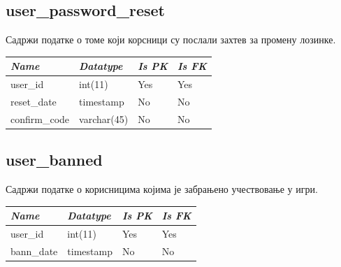 \subsection{user\_password\_reset}
Садржи податке о томе који корсници су послали захтев за промену лозинке.

\begin{table}[h!]
\centering
\small

    \begin{tabular}{ | m{} | m{} | m{} | m{} | }
    \hline
        \cellcolor{blue!25}\textbf{\textit{Name}} &

        \cellcolor{blue!25}\textbf{\textit{Datatype}} &
        \cellcolor{blue!25}\textbf{\textit{Is PK}} &
        \cellcolor{blue!25}\textbf{\textit{Is FK}} \\
    \hline
    \hline
        user\_id & int(11) & Yes & Yes \\
    \hline
        reset\_date & timestamp & No & No \\
    \hline
        confirm\_code & varchar(45) & No & No \\
    \hline
    \end{tabular}

\end{table}

\newpage

\subsection{user\_banned}
Садржи податке о корисницима којима је забрањено учествовање у игри.

\begin{table}[h!]
\centering
\small

    \begin{tabular}{ | m{} | m{} | m{} | m{} | }
    \hline
        \cellcolor{blue!25}\textbf{\textit{Name}} &

        \cellcolor{blue!25}\textbf{\textit{Datatype}} &
        \cellcolor{blue!25}\textbf{\textit{Is PK}} &
        \cellcolor{blue!25}\textbf{\textit{Is FK}} \\
    \hline
    \hline
        user\_id & int(11) & Yes & Yes \\
    \hline
        bann\_date & timestamp & No & No \\
    \hline
    \end{tabular}

\end{table}

